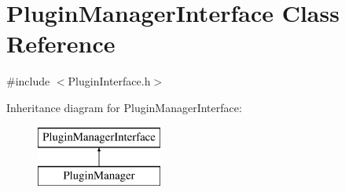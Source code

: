 \hypertarget{class_plugin_manager_interface}{}\section{Plugin\+Manager\+Interface Class Reference}
\label{class_plugin_manager_interface}


{\ttfamily \#include $<$Plugin\+Interface.\+h$>$}

Inheritance diagram for Plugin\+Manager\+Interface\+:\begin{figure}[H]
\begin{center}
\leavevmode
\includegraphics[height=2.000000cm]{class_plugin_manager_interface}
\end{center}
\end{figure}
